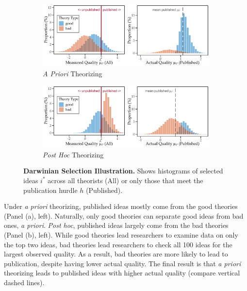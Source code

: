 \documentclass[12pt,english]{article}
\theoremstyle{plain}
\theoremstyle{plain}
\begin{document}
\begin{figure}[t]
    \def\tempwidth{1.0\textwidth}

    \centering
    \begin{subfigure}[b]{\textwidth}
        \centering
        \caption{\emph{A Priori} Theorizing}
        \includegraphics[width=\tempwidth]{../Results/many-par0-ap.pdf}
    \end{subfigure}
    
    \vspace{1em}
    
    \begin{subfigure}[b]{\textwidth}
        \centering
        \caption{\emph{Post Hoc} Theorizing}
        \includegraphics[width=\tempwidth]{../Results/many-par0-ph.pdf}
    \end{subfigure}
    \caption{\textbf{Darwinian Selection Illustration.} Shows histograms of selected ideas $i^{\ast}$ across all theorists (All) or only those that meet the publication hurdle $h$ (Published).}
    \label{fig:darwinian_selection}
\end{figure}

Under \emph{a priori} theorizing, published ideas mostly come from the good theories (Panel (a), left). Naturally, only good theories can separate good ideas from bad ones, \emph{a priori}. \emph{Post hoc}, published ideas largely come from the bad theories (Panel (b), left). While good theories lead researchers to examine data on only the top two ideas, bad theories lead researchers to check all 100 ideas for the largest observed quality. As a result, bad theories are more likely to lead to publication, despite having lower actual quality. The final result is that \emph{a priori} theorizing leads to published ideas with higher actual quality (compare vertical dashed lines).
\end{document}

